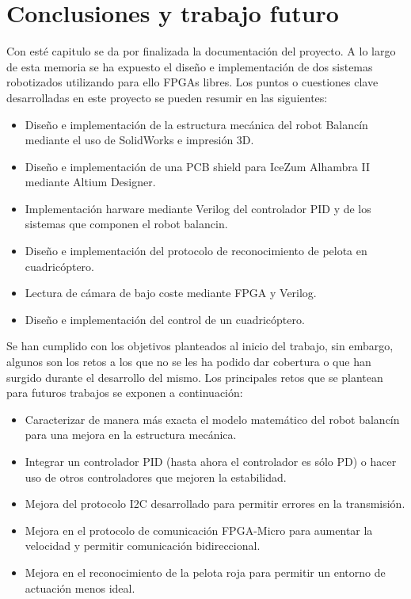 \chapter{Conclusiones y trabajo futuro}\label{sec: Conclusiones}

Con esté capitulo se da por finalizada la documentación del proyecto. A lo largo de esta memoria se ha expuesto el diseño e implementación de dos sistemas robotizados utilizando para ello FPGAs libres. Los puntos o cuestiones clave desarrolladas en este proyecto se pueden resumir en las siguientes:
\begin{itemize}
	\item Diseño e implementación de la estructura mecánica del robot Balancín mediante el uso de SolidWorks e impresión 3D.
	\item Diseño e implementación de una PCB shield para IceZum Alhambra II mediante Altium Designer.
	\item Implementación harware mediante Verilog del controlador PID y de los sistemas que componen el robot balancin.
	\item Diseño e implementación del protocolo de reconocimiento de pelota en cuadricóptero.
	\item Lectura de cámara de bajo coste mediante FPGA y Verilog. 
	\item Diseño e implementación del control de un cuadricóptero.
	
\end{itemize}

Se han cumplido con los objetivos planteados al inicio del trabajo, sin embargo, algunos son los retos a los que no se les ha podido dar cobertura o que han surgido durante el desarrollo del mismo. Los principales retos que se plantean para futuros trabajos se exponen a continuación:
\begin{itemize}
	\item Caracterizar de manera más exacta el modelo matemático del robot balancín para una mejora en la estructura mecánica.
	\item Integrar un controlador PID (hasta ahora el controlador es sólo PD) o hacer uso de otros controladores que mejoren la estabilidad.
	\item Mejora del protocolo I2C desarrollado para permitir errores en la transmisión.
	\item Mejora en el protocolo de comunicación FPGA-Micro para aumentar la velocidad y permitir comunicación bidireccional. 
	\item Mejora en el reconocimiento de la pelota roja para permitir un entorno de actuación menos ideal. 
\end{itemize}
